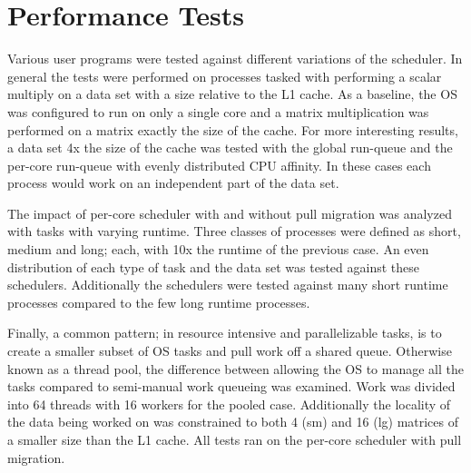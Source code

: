 \documentclass{cys}
\begin{document}
\section{Performance Tests}
\label{sec:perfTests}
Various user programs were tested against different variations of the scheduler.  In general the tests were performed on processes tasked with performing a scalar multiply on a data set with a size relative to the L1 cache.  As a baseline, the OS was configured to run on only a single core and a matrix multiplication was performed on a matrix exactly the size of the cache.  For more interesting results, a data set 4x the size of the cache was tested with the global run-queue and the per-core run-queue with evenly distributed CPU affinity.  In these cases each process would work on an independent part of the data set.  

The impact of per-core scheduler with and without pull migration was analyzed with tasks with varying runtime.  Three classes of processes were defined as short, medium and long; each, with 10x the runtime of the previous case.  An even distribution of each type of task and the data set was tested against these schedulers.  Additionally the schedulers were tested against many short runtime processes compared to the few long runtime processes.

Finally, a common pattern; in resource intensive and parallelizable tasks, is to create a smaller subset of OS tasks and pull work off a shared queue.  Otherwise known as a thread pool, the difference between allowing the OS to manage all the tasks compared to semi-manual work queueing was examined.  Work was divided into 64 threads with 16 workers for the pooled case.  Additionally the locality of the data being worked on was constrained to both 4 (sm) and 16 (lg) matrices of a smaller size than the L1 cache.  All tests ran on the per-core scheduler with pull migration.  


\begin{table}[h!]
    \centering
    \caption{single core - matrix 1x utilization}
\end{table}
\end{document}
